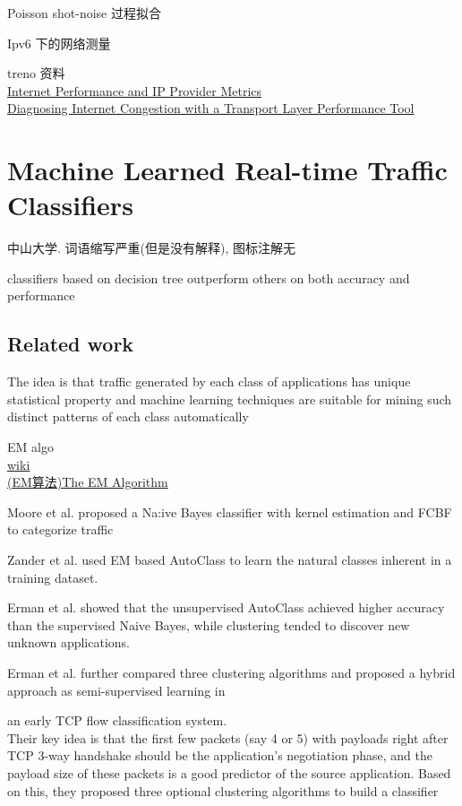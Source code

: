 \documentclass{article}
\begin{document}
Poisson shot-noise 过程拟合

Ipv6 下的网络测量

treno 资料\\\href{http://staff.psc.edu/mathis/ippm/}{Internet
Performance and IP Provider
Metrics}\\\href{http://staff.psc.edu/mathis/papers/inet96.treno.html}{Diagnosing
Internet Congestion with a Transport Layer Performance Tool}

\section{Machine Learned Real-time Traffic Classifiers}\label{machine-learned-real-time-traffic-classifiers}
中山大学. 词语缩写严重(但是没有解释), 图标注解无

classifiers based on decision tree outperform others on both accuracy and performance

\subsection{Related work}\label{related-work-1}
The idea is that traffic generated by each class of applications has
unique statistical property and machine learning techniques are suitable
for mining such distinct patterns of each class automatically

EM algo\\
\href{http://en.wikipedia.org/wiki/Expectation\%E2\%80\%93maximization_algorithm}{wiki}\\
\href{http://www.cnblogs.com/jerrylead/archive/2011/04/06/2006936.html}{(EM算法)The EM Algorithm}

Moore et al. proposed a Na:ive Bayes classifier with kernel estimation and FCBF to categorize traffic

Zander et al. used EM based AutoClass to learn the natural classes inherent in a training dataset.

Erman et al. showed that the unsupervised AutoClass achieved higher accuracy than the supervised Na\:ive Bayes, while clustering tended to discover new unknown applications.

Erman et al. further compared three clustering algorithms and proposed a hybrid approach as semi-supervised learning in

an early TCP flow classification system.\\
Their key idea is that the first few packets (say 4 or 5) with payloads right after TCP 3-way handshake should be the application's negotiation phase, and the payload size of these packets is a good predictor of the source application.  Based on this, they proposed three optional clustering algorithms to build a classifier
\end{document}
